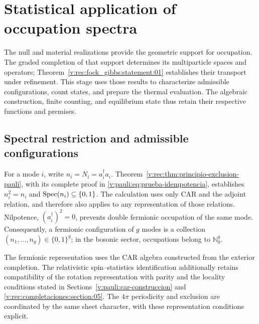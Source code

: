 \section{Statistical application of occupation spectra}
\label{v:rec:chap:ocupacion-estadistica}

The null and material realizations provide the geometric support for
occupation. The graded completion of that support determines its
multiparticle spaces and operators;
Theorem~\ref{v:rec:fock_gibbs:statement:01} establishes their transport under
refinement. This stage uses those results to characterize
admissible configurations, count states, and prepare the thermal evaluation.
The algebraic construction, finite counting, and equilibrium state
thus retain their respective functions and premises.

\subsection{Spectral restriction and admissible configurations}
\label{v:rec:pauli:section:02}

For a mode \(i\), write \(n_i=N_i=a_i^\dagger a_i\).
Theorem~\ref{v:rec:thm:principio-exclusion-pauli}, with its complete proof in
\eqref{v:pauli:eq:prueba-idempotencia}, establishes
\(n_i^2=n_i\) and \(\operatorname{Spec}(n_i)\subseteq\{0,1\}\). The calculation uses
only CAR and the adjoint relation, and therefore also applies
to any representation of those relations. Nilpotence,
\((a_i^\dagger)^2=0\), prevents double fermionic occupation of the same mode.
Consequently, a fermionic configuration of \(g\) modes is a
collection \((n_1,\ldots,n_g)\in\{0,1\}^g\); in the bosonic sector,
occupations belong to \(\mathbb N_0^g\).

The fermionic representation uses the CAR algebra constructed from the
exterior completion. The relativistic spin--statistics
identification additionally retains compatibility of the rotation
representation with parity and the locality conditions stated in
Sections~\ref{v:pauli:car-construccion} and
\ref{v:rec:completaciones:section:05}. The \(4\pi\) periodicity and
exclusion are coordinated by the same sheet character, with these
representation conditions explicit.

